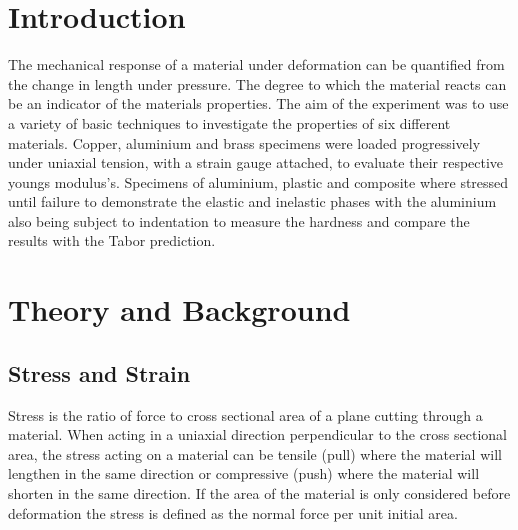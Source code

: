 \documentclass[a4paper,10pt]{article}
\begin{document}
\begin{titlepage}
\vspace*{-2cm}
\vspace{2cm}
\vspace{2cm}          
\vspace{2cm}   

\vspace{7cm}

\end{titlepage}  

\newpage
\newpage
{}
\listoffigures\newpage



\newpage
\section{Introduction}
The mechanical response of a material under deformation can be quantified from the change in length under pressure. The degree to which the material reacts can be an indicator of the materials properties. The aim of the experiment was to use a variety of basic techniques to investigate the properties of six different materials. Copper, aluminium and brass specimens were loaded progressively under uniaxial tension, with a strain gauge attached, to evaluate their respective youngs modulus's. Specimens of aluminium, plastic and composite where stressed until failure to demonstrate the elastic and inelastic phases with the aluminium also being subject to indentation to measure the hardness and compare the results with the Tabor prediction.

\section{Theory and Background}
\subsection{Stress and Strain}
Stress is the ratio of force to cross sectional area of a plane cutting through a material. When acting in a uniaxial direction perpendicular to the cross sectional area, the stress acting on a material can be tensile (pull) where the material will lengthen in the same direction or compressive (push) where the material will shorten in the same direction. If the area of the material is only considered before deformation the stress is defined as the normal force per unit initial area.
\end{document}
